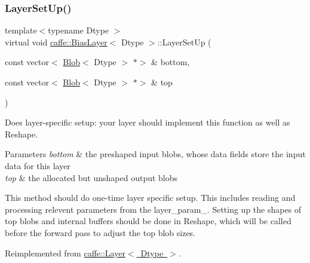 \subsubsection{\texorpdfstring{Layer\+Set\+Up()}{LayerSetUp()}\hspace{0.1cm}{\footnotesize\ttfamily [1/2]}}
{\footnotesize\ttfamily template$<$typename Dtype $>$ \\
virtual void \mbox{\hyperlink{classcaffe_1_1_bias_layer}{caffe\+::\+Bias\+Layer}}$<$ Dtype $>$\+::Layer\+Set\+Up (\begin{DoxyParamCaption}\item[{const vector$<$ \mbox{\hyperlink{classcaffe_1_1_blob}{Blob}}$<$ Dtype $>$ $\ast$$>$ \&}]{bottom,  }\item[{const vector$<$ \mbox{\hyperlink{classcaffe_1_1_blob}{Blob}}$<$ Dtype $>$ $\ast$$>$ \&}]{top }\end{DoxyParamCaption})\hspace{0.3cm}{\ttfamily [virtual]}}



Does layer-\/specific setup\+: your layer should implement this function as well as Reshape. 


\begin{DoxyParams}{Parameters}
{\em bottom} & the preshaped input blobs, whose data fields store the input data for this layer \\
\hline
{\em top} & the allocated but unshaped output blobs\\
\hline
\end{DoxyParams}
This method should do one-\/time layer specific setup. This includes reading and processing relevent parameters from the {\ttfamily layer\+\_\+param\+\_\+}. Setting up the shapes of top blobs and internal buffers should be done in {\ttfamily Reshape}, which will be called before the forward pass to adjust the top blob sizes. 

Reimplemented from \mbox{\hyperlink{classcaffe_1_1_layer_a481323a3e0972c682787f2137468c29f}{caffe\+::\+Layer$<$ Dtype $>$}}.

\mbox{\label{classcaffe_1_1_bias_layer_aa62a9554bf4fc3eb4db124da0d89fd85}} 

